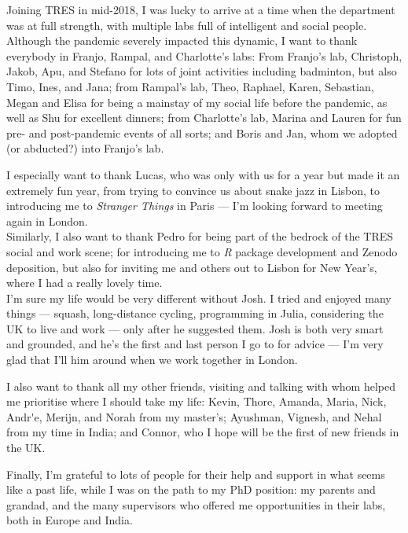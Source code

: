 Joining TRES in mid-2018, I was lucky to arrive at a time when the department was at full strength, with multiple labs full of intelligent and social people.
Although the pandemic severely impacted this dynamic, I want to thank everybody in Franjo, Rampal, and Charlotte's labs:
From Franjo's lab, Christoph, Jakob, Apu, and Stefano for lots of joint activities including badminton, but also Timo, Ines, and Jana;
from Rampal's lab, Theo, Raphael, Karen, Sebastian, Megan and Elisa for being a mainstay of my social life before the pandemic, as well as Shu for excellent dinners;
from Charlotte's lab, Marina and Lauren for fun pre- and post-pandemic events of all sorts;
and Boris and Jan, whom we adopted (or abducted?) into Franjo's lab.

I especially want to thank Lucas, who was only with us for a year but made it an extremely fun year, from trying to convince us about snake jazz in Lisbon, to introducing me to \textit{Stranger Things} in Paris --- I'm looking forward to meeting again in London.\\
Similarly, I also want to thank Pedro for being part of the bedrock of the TRES social and work scene; for introducing me to \textit{R} package development and Zenodo deposition, but also for inviting me and others out to Lisbon for New Year's, where I had a really lovely time.\\
I'm sure my life would be very different without Josh.
I tried and enjoyed many things --- squash, long-distance cycling, programming in Julia, considering the UK to live and work --- only after he suggested them.
Josh is both very smart and grounded, and he's the first and last person I go to for advice --- I'm very glad that I'll him around when we work together in London.

I also want to thank all my other friends, visiting and talking with whom helped me prioritise where I should take my life: Kevin, Thore, Amanda, Maria, Nick, Andr{\'}e, Merijn, and Norah from my master's; Ayushman, Vignesh, and Nehal from my time in India; and Connor, who I hope will be the first of new friends in the UK.

Finally, I'm grateful to lots of people for their help and support in what seems like a past life, while I was on the path to my PhD position: my parents and grandad, and the many supervisors who offered me opportunities in their labs, both in Europe and India.

{ \begin{center}  \end{center} }

\endgroup

